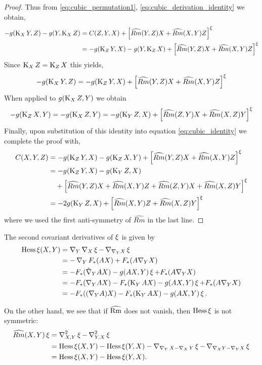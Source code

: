\documentclass{amsart}
\begin{document}
\begin{proof}
Thus from \eqref{eq:cubic_permutation1}, \eqref{eq:cubic_derivation_identity} we obtain,
\begin{equation}
\label{eq:cubic_identity}
\begin{split} 
-g(\operatorname{K}_X Y, Z) - g(Y, \operatorname{K}_X Z) &= C(Z, Y, X) + \left[\widehat{Rm}(Y, Z) X + \widehat{Rm}(X, Y)Z\right]^{\operatorname{\xi}} \\
&= -g(\operatorname{K}_Z Y, X) - g(Y, \operatorname{K}_Z X) + \left[\widehat{Rm}(Y, Z) X + \widehat{Rm}(X, Y)Z\right]^{\operatorname{\xi}}
\end{split}
\end{equation}
Since $\operatorname{K}_X Z = \operatorname{K}_Z X$ this yields,
\[
-g(\operatorname{K}_X Y, Z) = - g(\operatorname{K}_Z Y, X) + \left[\widehat{Rm}(Y, Z) X + \widehat{Rm}(X, Y)Z\right]^{\operatorname{\xi}}
\]
When applied to $g(\operatorname{K}_X Z, Y)$ we obtain
\[
-g(\operatorname{K}_Z X, Y) = - g(\operatorname{K}_X Z, Y) = - g(\operatorname{K}_Y Z, X) + \left[\widehat{Rm}(Z, Y) X + \widehat{Rm}(X, Z)Y\right]^{\operatorname{\xi}}
\]
Finally, upon substitution of this identity into equation \eqref{eq:cubic_identity} we complete the proof with,
\begin{equation}
\begin{split}
C(X, Y, Z) &= -g(\operatorname{K}_Z Y, X) - g(\operatorname{K}_Z X, Y) + \left[\widehat{Rm}(Y, Z) X + \widehat{Rm}(X, Y)Z\right]^{\operatorname{\xi}} \\
&= -g(\operatorname{K}_Z Y, X) - g(\operatorname{K}_Y Z, X) \\
&\quad + \left[\widehat{Rm}(Y, Z) X + \widehat{Rm}(X, Y)Z + \widehat{Rm}(Z, Y) X + \widehat{Rm}(X, Z)Y\right]^{\operatorname{\xi}} \\
&= - 2g(\operatorname{K}_Y Z, X) + \left[\widehat{Rm}(X, Y)Z + \widehat{Rm}(X, Z)Y\right]^{\operatorname{\xi}}
\end{split}
\end{equation}
where we used the first anti-symmetry of $\widehat{Rm}$ in the last line.
\end{proof}

The second covariant derivatives of $ \operatorname{\xi}$ is given by
\begin{align}
\operatorname{Hess}\operatorname{\xi}(X,Y)&=\operatorname{\nabla}_Y\operatorname{\nabla}_X\operatorname{\xi}-\operatorname{\nabla}_{\nabla_YX}\operatorname{\xi}\\
&=-\operatorname{\nabla}_YF_{\ast}(AX)+F_{\ast}(A\nabla_YX)\nonumber\\
&=-F_{\ast}(\tilde{\nabla}_{Y}AX)-g(A X,Y)\operatorname{\xi}+F_{\ast}(A\nabla_YX)\nonumber\\
&=-F_{\ast}(\nabla_{Y}AX)-F_{\ast}(\operatorname{K}_{Y}AX)-g(A X,Y)\operatorname{\xi}+F_{\ast}(A\nabla_YX)\nonumber\\
&=-F_{\ast}((\nabla_Y A)X)-F_{\ast}(\operatorname{K}_{Y}AX)-g(A X,Y)\operatorname{\xi}.\nonumber
\end{align}

On the other hand, we see that if $\widehat{\operatorname{Rm}}$ does not vanish, then $\operatorname{Hess} \operatorname{\xi}$ is not symmetric:
\begin{align}
\widehat{Rm}(X,Y)\operatorname{\xi}&=\operatorname{\nabla}^2_{X,Y}\operatorname{\xi}-\operatorname{\nabla}^2_{Y,X}\operatorname{\xi}\\
&=\operatorname{Hess}\operatorname{\xi}(X,Y)-\operatorname{Hess}\operatorname{\xi}(Y,X)-\operatorname{\nabla}_{\operatorname{\nabla}_YX-\operatorname{\nabla}_XY}\operatorname{\xi}-\operatorname{\nabla}_{\nabla_XY-\nabla_YX}\operatorname{\xi}\nonumber\\
&=\operatorname{Hess}\operatorname{\xi}(X,Y)-\operatorname{Hess}\operatorname{\xi}(Y,X).\nonumber
\end{align}
\end{document}
